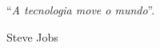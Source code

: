 \begin{epigrafe}
	
	\vspace*{\fill}
	\epigraph{``\emph{A tecnologia move o mundo}''.}{Steve Jobs}
	
\end{epigrafe}